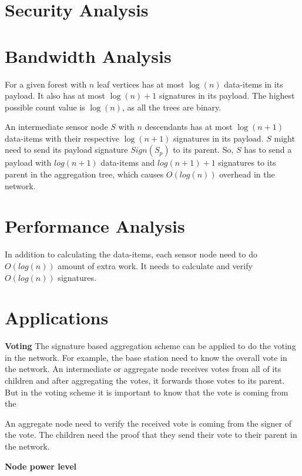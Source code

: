	

\newpage
\section{Security Analysis}

\section{Bandwidth Analysis}
	For a given forest with $n$ leaf vertices has at most $\log(n)$ data-items in its payload.
	It also has at most $\log(n)+1$ signatures in its payload.
	The highest possible count value is $\log(n)$, as all the trees are binary. 

	An intermediate sensor node $S$ with $n$ descendants has at most $\log(n+1)$ data-items with their respective $\log(n+1)$ signatures in its payload.
	$S$ might need to send its payload signature $Sign(S_{p})$ to its parent.
	So, $S$ has to send a payload with $log(n+1)$ data-items and $log(n+1) +1$ signatures to its parent in the aggregation tree, which causes $O(log(n))$ overhead in the network. 

\section{Performance Analysis}
	In addition to calculating the data-items, each sensor node need to do $O(log(n))$ amount of extra work. It needs to calculate and verify $O(log(n))$ signatures. 


\section{Applications}

	\textbf{Voting}
		The signature based aggregation scheme can be applied to do the voting in the network. 
		For example, the base station need to know the overall vote in the network.
		An intermediate or aggregate node receives votes from all of its children and after aggregating the votes, it forwards those votes to its parent.
		But in the voting scheme it is important to know that the vote is coming from the 
		
		An aggregate node need to verify the received vote is coming from the signer of the vote.
		The children need the proof that they send their vote to their parent in the network.

	\textbf{Node power level}
